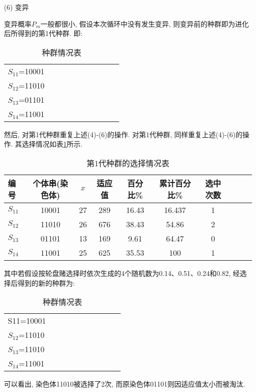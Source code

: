  (6) 变异

变异概率$P_m$一般都很小, 假设本次循环中没有发生变异, 则变异前的种群即为进化后所得到的第1代种群. 即:
\begin{table} [H]
\caption{种群情况表}
\vspace{-0.6cm}
\begin{center}
\begin{tabular} {lccccccccc}
\hline
    $S_{11}$=10001\\
    $S_{12}$=11010\\
    $S_{13}$=01101\\
    $S_{14}$=11001\\
\hline
\end{tabular}
\end{center}\vspace{-0.4cm}
\end{table}

然后, 对第1代种群重复上述(4)-(6)的操作.
对第1代种群, 同样重复上述(4)-(6)的操作. 其选择情况如表\ref{AI_table2019112807}所示.
\begin{table} [H]
\caption{第1代种群的选择情况表}
\vspace{-0.6cm}
\begin{center}
\begin{tabular} {lccccccccc}
  \hline
编号	&个体串(染色体)&	 $x$	&适应值	&百分比\%	&累计百分比\%	&选中次数\\
  \hline
$S_{11}$	&10001	&27	&289	&16.43	&16.437	&1\\
$S_{12}$&	11010	&26	&676&38.43	&54.86	&2\\
$S_{13}$&	01101	&13	&169	&9.61	&64.47	&0\\
$S_{14}$	&11001	&25	&625	&35.53	&100	&1\\
\hline
\end{tabular}
\end{center}
\label{AI_table2019112807}
\vspace{-0.4cm}
\end{table}
其中若假设按轮盘赌选择时依次生成的4个随机数为0.14、0.51、0.24和0.82, 经选择后得到的新的种群为:
\begin{table} [H]
\caption{种群情况表}
\vspace{-0.6cm}
\begin{center}
    \begin{tabular} {lccccccccc}
    \hline
    S11=10001\\
        $S_{12}$=11010\\
        $S_{13}$=11010\\
        $S_{14}$=11001\\
    \hline
    \end{tabular}
    \end{center}
    \vspace{-0.4cm}
\end{table}
可以看出, 染色体11010被选择了2次, 而原染色体01101则因适应值太小而被淘汰.

